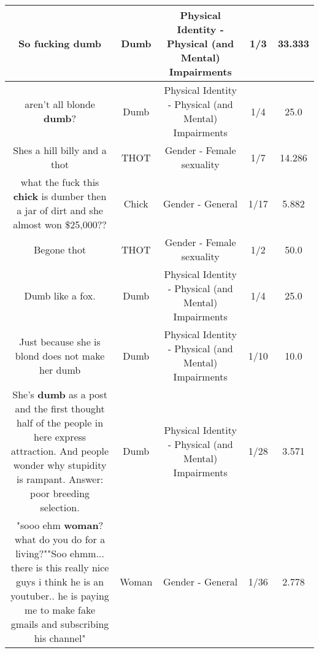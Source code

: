 \documentclass[11pt]{article}
\newlength\mylength
\begin{document}
\begin{center}
\begin{longtable}{|C{.65\mylength}|C{.30\mylength}|C{.12\mylength}|C{.12\mylength}|C{.12\mylength}|}
  \small So fucking dumb\normalsize   & Dumb & Physical Identity - Physical (and Mental) Impairments & 1/3 & 33.333 \\  \hline
  \small aren't all blonde \textbf{dumb}?\normalsize   & Dumb & Physical Identity - Physical (and Mental) Impairments & 1/4 & 25.0 \\  \hline
  \small Shes a hill billy and a thot\normalsize   & THOT & Gender - Female sexuality & 1/7 & 14.286 \\  \hline
  \small what the fuck this \textbf{chick} is dumber then a jar of dirt and she almost won \$25,000??\normalsize   & Chick & Gender - General & 1/17 & 5.882 \\  \hline
  \small Begone thot\normalsize   & THOT & Gender - Female sexuality & 1/2 & 50.0 \\  \hline
  \small Dumb like a fox.\normalsize   & Dumb & Physical Identity - Physical (and Mental) Impairments & 1/4 & 25.0 \\  \hline
  \small Just because she is blond does not make her dumb\normalsize   & Dumb & Physical Identity - Physical (and Mental) Impairments & 1/10 & 10.0 \\  \hline
  \small She's \textbf{dumb} as a post and the first thought half of the people in here express attraction. And people wonder why stupidity is rampant. Answer:  poor breeding selection.\normalsize   & Dumb & Physical Identity - Physical (and Mental) Impairments & 1/28 & 3.571 \\  \hline
  \small "sooo ehm \textbf{woman}? what do you do for a living?""Soo ehmm... there is this really nice guys i think he is an youtuber.. he is paying me to make fake gmails and subscribing his channel"\normalsize   & Woman & Gender - General & 1/36 & 2.778 \\  \hline

\end{longtable}
\end{center}
\end{document}
